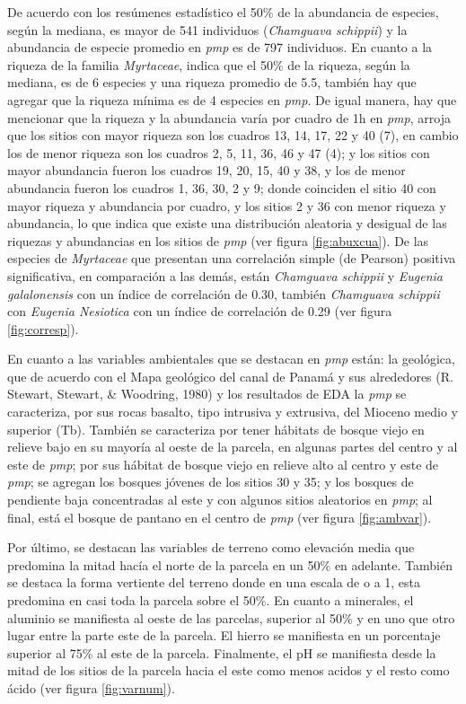 \documentclass[11pt,]{article}
\begin{document}
De acuerdo con los resúmenes estadístico el 50\% de la abundancia de
especies, según la mediana, es mayor de 541 individuos (\emph{Chamguava
schippii}) y la abundancia de especie promedio en \emph{pmp} es de 797
individuos. En cuanto a la riqueza de la familia \emph{Myrtaceae},
indica que el 50\% de la riqueza, según la mediana, es de 6 especies y
una riqueza promedio de 5.5, también hay que agregar que la riqueza
mínima es de 4 especies en \emph{pmp}. De igual manera, hay que
mencionar que la riqueza y la abundancia varía por cuadro de 1h en
\emph{pmp}, arroja que los sitios con mayor riqueza son los cuadros 13,
14, 17, 22 y 40 (7), en cambio los de menor riqueza son los cuadros 2,
5, 11, 36, 46 y 47 (4); y los sitios con mayor abundancia fueron los
cuadros 19, 20, 15, 40 y 38, y los de menor abundancia fueron los
cuadros 1, 36, 30, 2 y 9; donde coinciden el sitio 40 con mayor riqueza
y abundancia por cuadro, y los sitios 2 y 36 con menor riqueza y
abundancia, lo que indica que existe una distribución aleatoria y
desigual de las riquezas y abundancias en los sitios de \emph{pmp} (ver
figura \ref{fig:abuxcua}). De las especies de \emph{Myrtaceae} que
presentan una correlación simple (de Pearson) positiva significativa, en
comparación a las demás, están \emph{Chamguava schippii} y \emph{Eugenia
galalonensis} con un índice de correlación de 0.30, también
\emph{Chamguava schippii} con \emph{Eugenia Nesiotica} con un índice de
correlación de 0.29 (ver figura \ref{fig:corresp}).

En cuanto a las variables ambientales que se destacan en \emph{pmp}
están: la geológica, que de acuerdo con el Mapa geológico del canal de
Panamá y sus alrededores (R. Stewart, Stewart, \& Woodring, 1980) y los
resultados de EDA la \emph{pmp} se caracteriza, por sus rocas basalto,
tipo intrusiva y extrusiva, del Mioceno medio y superior (Tb). También
se caracteriza por tener hábitats de bosque viejo en relieve bajo en su
mayoría al oeste de la parcela, en algunas partes del centro y al este
de \emph{pmp}; por sus hábitat de bosque viejo en relieve alto al centro
y este de \emph{pmp}; se agregan los bosques jóvenes de los sitios 30 y
35; y los bosques de pendiente baja concentradas al este y con algunos
sitios aleatorios en \emph{pmp}; al final, está el bosque de pantano en
el centro de \emph{pmp} (ver figura \ref{fig:ambvar}).

Por último, se destacan las variables de terreno como elevación media
que predomina la mitad hacía el norte de la parcela en un 50\% en
adelante. También se destaca la forma vertiente del terreno donde en una
escala de o a 1, esta predomina en casi toda la parcela sobre el 50\%.
En cuanto a minerales, el aluminio se manifiesta al oeste de las
parcelas, superior al 50\% y en uno que otro lugar entre la parte este
de la parcela. El hierro se manifiesta en un porcentaje superior al 75\%
al este de la parcela. Finalmente, el pH se manifiesta desde la mitad de
los sitios de la parcela hacia el este como menos acidos y el resto como
ácido (ver figura \ref{fig:varnum}).
\end{document}
